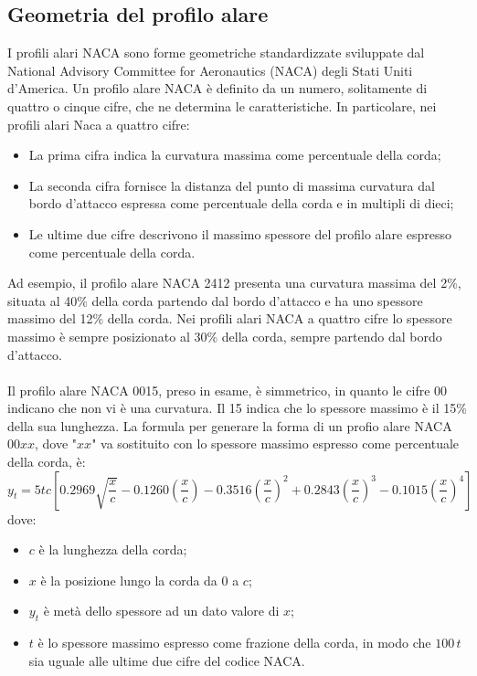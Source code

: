 \subsection{Geometria del profilo alare}
I profili alari NACA sono forme geometriche standardizzate sviluppate dal National Advisory Committee for Aeronautics (NACA) degli Stati Uniti d'America. Un profilo alare NACA è definito da un numero, solitamente di quattro o cinque cifre, che ne determina le caratteristiche. In particolare, nei profili alari Naca a quattro cifre:
\begin{itemize}
    \item La prima cifra indica la curvatura massima come percentuale della corda;
    \item La seconda cifra fornisce la distanza del punto di massima curvatura dal bordo d'attacco espressa come percentuale della corda e in multipli di dieci;
    \item Le ultime due cifre descrivono il massimo spessore del profilo alare espresso come percentuale della corda.
\end{itemize}
Ad esempio, il profilo alare NACA 2412 presenta una curvatura massima del 2\%, situata al 40\% della corda partendo dal bordo d'attacco e ha uno spessore massimo del 12\% della corda. Nei profili alari NACA a quattro cifre lo spessore massimo è sempre posizionato al 30\% della corda, sempre partendo dal bordo d'attacco.\\\\
Il profilo alare NACA 0015, preso in esame, è simmetrico, in quanto le cifre 00 indicano che non vi è una curvatura. Il 15 indica che lo spessore massimo è il 15\% della sua lunghezza.
\newpage
\noindent La formula per generare la forma di un profio alare NACA $00xx$, dove "$xx$" va sostituito con lo spessore massimo espresso come percentuale della corda, è:
\begin{equation*}
    y_t = 5tc\left[ 0.2969\sqrt{\frac{x}{c}} -0.1260\left(\frac{x}{c}\right) -0.3516\left(\frac xc \right)^2 + 0.2843 \left( \frac xc \right)^3 -0.1015 \left( \frac xc \right)^4 \right]
\end{equation*}
dove:
\begin{itemize}
    \item $c$ è la lunghezza della corda;
    \item $x$ è la posizione lungo la corda da 0 a $c$;
    \item $y_t$ è metà dello spessore ad un dato valore di $x$;
    \item $t$ è lo spessore massimo espresso come frazione della corda, in modo che $100\,t$ sia uguale alle ultime due cifre del codice NACA.
\end{itemize}

